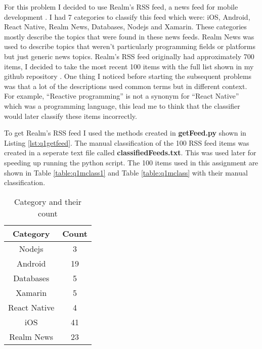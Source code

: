 \documentclass[letterpaper,11pt]{article}
\newcommand*{\srcPath}{../src}%
\begin{document}
For this problem I decided to use Realm's RSS feed, a news feed for mobile development \cite{realmref}. I had 7 categories to classify this feed which were: iOS, Android, React Native, Realm News, Databases, Nodejs and Xamarin. These categories mostly describe the topics that were found in these news feeds. Realm News was used to describe topics that weren't particularly programming fields or platforms but just generic news topics. Realm's RSS feed originally had approximately 700 items, I decided to take the most recent 100 items with the full list shown in my github repository \cite{github}. One thing I noticed before starting the subsequent problems was that a lot of the descriptions used common terms but in different context. For example, ``Reactive programming'' is not a synonym for ``React Native'' which was a programming language, this lead me to think that the classifier would later classify these items incorrectly.

To get Realm's RSS feed I used the methods created in \textbf{getFeed.py} shown in Listing \ref{lst:q1getfeed}. The manual classification of the 100 RSS feed items was created in a seperate text file called \textbf{classifiedFeeds.txt}. This was used later for speeding up running the python script. The 100 items used in this assignment are shown in Table \ref{table:q1mclass1} and Table \ref{table:q1mclass} with their manual classification.

\begin{table}[h]
\centering
\begin{adjustbox}{max width=\linewidth}
\begin{tabular}{ | c | c |}
\hline
\textbf{Category} & \textbf{Count}  \\
\hline
Nodejs & 3 \\
Android & 19 \\
Databases & 5  \\
Xamarin & 5  \\
React Native & 4 \\
iOS & 41  \\
Realm News & 23 \\
\hline
\end{tabular}
\end{adjustbox}
\caption{Category and their count}
\label{table:q3calcs}
\end{table}

\clearpage

 
\end{document}
